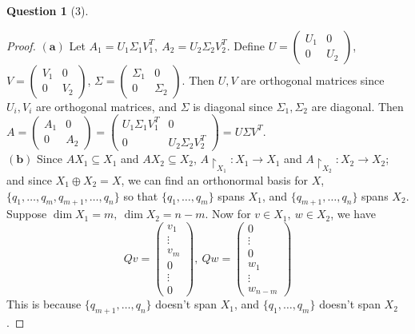 \documentclass[11pt]{article}
\theoremstyle{quest}
\newtheorem*{question}{Question}
\begin{document}
\begin{question}[3]
\end{question}
\begin{proof}
$\mathbf{(a)}$ Let $A_1 = U_1 \Sigma_1 V_1^T,\ A_2 = U_2 \Sigma_2 V_2^T$. Define $U = \begin{pmatrix}
U_1 & 0 \\
0 & U_2
\end{pmatrix}$, $V = \begin{pmatrix}
V_1 & 0 \\
0 & V_2
\end{pmatrix}$, $\Sigma = \begin{pmatrix}
\Sigma_1 & 0 \\
0 & \Sigma_2
\end{pmatrix}$. Then $U, V$ are orthogonal matrices since $U_i, V_i$ are orthogonal matrices, and $\Sigma$ is diagonal since $\Sigma_1, \Sigma_2$ are diagonal. Then
\\$A = \begin{pmatrix}
A_1 & 0 \\
0 & A_2
\end{pmatrix} = \begin{pmatrix}
U_1 \Sigma_1 V_1^T & 0 \\
0 & U_2 \Sigma_2 V_2^T 
\end{pmatrix} = U \Sigma V^T$.
\\$\mathbf{(b)}$ Since $AX_1 \subseteq X_1$ and $AX_2 \subseteq X_2$, $A \restriction_{X_1} : X_1 \rightarrow X_1$ and $A \restriction_{X_2} : X_2 \rightarrow X_2$; and since $X_1 \oplus X_2 = X$, we can find an orthonormal basis for $X$, $\{q_1, \ldots, q_m, q_{m+1}, \ldots, q_n\}$ so that $\{q_1, \ldots, q_m\}$ spans $X_1$, and $\{q_{m+1}, \ldots, q_n\}$ spans $X_2$.
Suppose $\dim X_1 = m,\ \dim X_2 = n-m$. Now for $v \in X_1,\ w \in X_2$, we have
$$Qv = \begin{pmatrix}
v_1 \\
\vdots \\
v_m \\
0 \\
\vdots \\
0
\end{pmatrix},\ Qw = \begin{pmatrix}
0 \\
\vdots \\
0 \\
w_1 \\
\vdots \\
w_{n-m}
\end{pmatrix}$$
This is because $\{q_{m+1}, \ldots, q_n\}$ doesn't span $X_1$, and $\{q_1, \ldots, q_m\}$ doesn't span $X_2$.

\end{proof}
\end{document}
